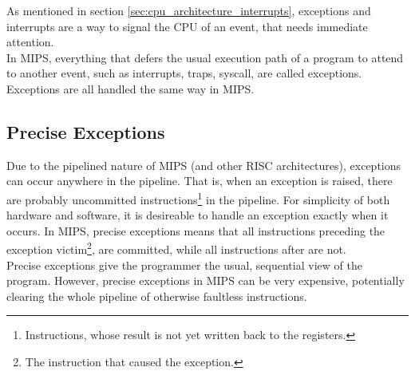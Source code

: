 As mentioned in section \ref{sec:cpu_architecture_interrupts}, exceptions and
interrupts are a way to signal the CPU of an event, that needs immediate
attention.\\
In MIPS, everything that defers the usual execution path of a program to attend to
another event, such as interrupts, traps, syscall, are called exceptions\cite{see_mips_run}.
Exceptions are all handled the same way in MIPS.

\subsection{Precise Exceptions}
Due to the pipelined nature of MIPS (and other RISC architectures), exceptions
can occur anywhere in the pipeline. That is, when an exception is raised, there
are probably uncommitted instructions\footnote{Instructions, whose result is not
yet written back to the registers.} in the pipeline. For simplicity of both hardware and
software, it is desireable to handle an exception exactly when it occurs. In
MIPS, precise exceptions means that all instructions preceding the exception
victim\footnote{The instruction that caused the exception.}, are committed, while
all instructions after are not.\\
Precise exceptions give the programmer the usual, sequential view of the
program. However, precise exceptions in MIPS can be very expensive, potentially
clearing the whole pipeline of otherwise faultless instructions.

